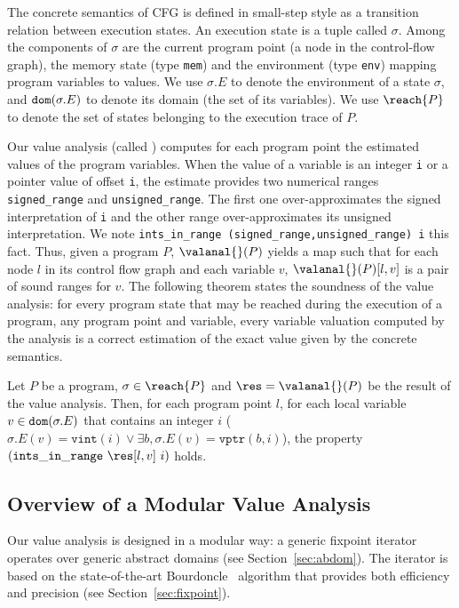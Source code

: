 The concrete semantics of CFG is defined in small-step style as a
transition relation between execution states.  
An execution state is a tuple called $\sigma$. Among the components of
$\sigma$ are the current program point (\ie a node in the control-flow graph), 
the memory state (type \lstinline!mem!) and the environment
(type \lstinline!env!) mapping program variables to values.  
We use $\sigma.E$ to denote the environment of a state $\sigma$,
and ${\tt dom}(\sigma.E)$ to denote its domain (\ie the set of its
variables). We use 
$\reach{P}$ to denote the set of states belonging to the
execution trace of $P$.

Our value analysis (called {\tt \valanal{}}) computes
for each program point the estimated values of the program variables.
When the value of a variable is an integer \lstinline!i!  or a pointer
value of offset \lstinline!i!, the estimate provides two numerical
ranges \lstinline!signed_range! and
\lstinline!unsigned_range!. The first one over-approximates the signed interpretation of
\lstinline!i! and the other range over-approximates its unsigned
interpretation. We note \lstinline!ints_in_range (signed_range,unsigned_range) i! this fact.
Thus, given a program $P$,  $\valanal{}(P)$ yields a map
such that for each node $l$ in its control flow graph and
 each variable $v$,
$\valanal{}(P)[l,v]$ is a pair of sound ranges for $v$.
The following theorem states the soundness of the value analysis: for
every program state that may be reached during the execution of a program,
any program point and variable, every variable valuation computed
by the analysis is a correct estimation of the exact value
given by the concrete semantics.

\begin{theorem}
Let $P$ be a program, $\sigma\in\reach{P}$ and
$\res=\valanal{} (P)$ be the result of the value
analysis. Then, for each program point $l$, for
each local variable
$v\in{\tt dom}(\sigma.E)$
that contains an integer $i$ {\textup(}\ie
$  \sigma.E(v) = \mathtt{vint}(i) \vee \exists b, \sigma.E(v) = \mathtt{vptr}(b,i) ${\textup)},
the property $(\mathtt{ints\_in\_range}~\res[l,v] ~ i)$ holds. 
\end{theorem} 


\subsection{Overview of a Modular Value Analysis}

Our value analysis is designed in a modular way: a generic fixpoint iterator
operates over generic abstract domains (see Section~\ref{sec:abdom}). The iterator is based on the
state-of-the-art Bourdoncle~\cite{bourdoncle93} algorithm that provides both efficiency
and precision (see Section~\ref{sec:fixpoint}).

